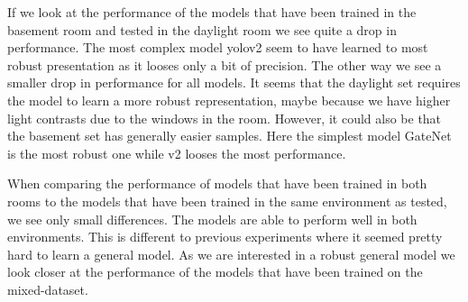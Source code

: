 \documentclass{article}
\begin{document}
If we look at the performance of the models that have been trained in the basement room and tested in the daylight room we see quite a drop in performance. The most complex model yolov2 seem to have learned to most robust presentation as it looses only a bit of precision. The other way we see a smaller drop in performance for all models. It seems that the daylight set requires the model to learn a more robust representation, maybe because we have higher light contrasts due to the windows in the room. However, it could also be that the basement set has generally easier samples. Here the simplest model GateNet is the most robust one while v2 looses the most performance.

When comparing the performance of models that have been trained in both rooms to the models that have been trained in the same environment as tested, we see only small differences. The models are able to perform well in both environments. This is different to previous experiments where it seemed pretty hard to learn a general model. As we are interested in a robust general model we look closer at the performance of the models that have been trained on the mixed-dataset.
\end{document}
